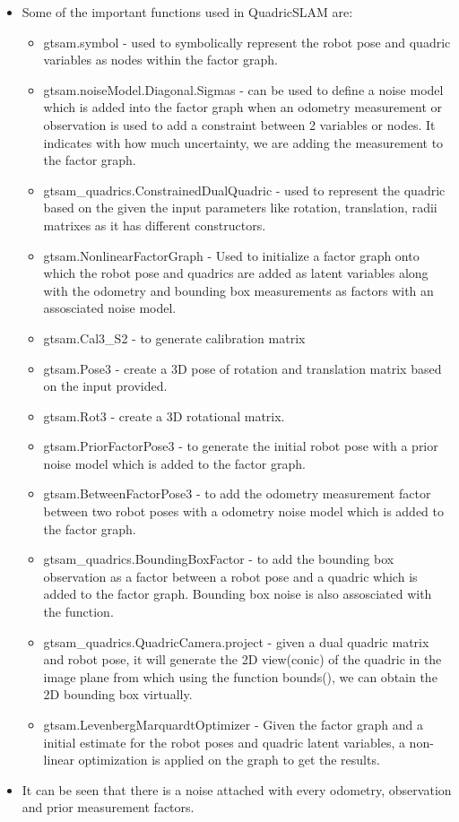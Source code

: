 \documentclass{article}
\begin{document}
\begin{itemize}
\item Some of the important functions used in QuadricSLAM are:
\begin{itemize}
    \item gtsam.symbol - used to symbolically represent the robot pose and quadric variables as nodes within the factor graph.
    \item gtsam.noiseModel.Diagonal.Sigmas - can be used to define a noise model which is added into the factor graph when an odometry measurement or observation is used to add a constraint between 2 variables or nodes. It indicates with how much uncertainty, we are adding the measurement to the factor graph.
    \item gtsam\_quadrics.ConstrainedDualQuadric - used to represent the quadric based on the given the input parameters like rotation, translation, radii matrixes as it has different constructors.
    \item gtsam.NonlinearFactorGraph - Used to initialize a factor graph onto which the robot pose and quadrics are added as latent variables along with the odometry and bounding box measurements as factors with an assosciated noise model.
    \item gtsam.Cal3\_S2 - to generate calibration matrix
    \item gtsam.Pose3 - create a 3D pose of rotation and translation matrix based on the input provided.
    \item gtsam.Rot3 - create a 3D rotational matrix.
    \item gtsam.PriorFactorPose3 - to generate the initial robot pose with a prior noise model which is added to the factor graph.
    \item gtsam.BetweenFactorPose3 - to add the odometry measurement factor between two robot poses with a odometry noise model which is added to the factor graph.
    \item gtsam\_quadrics.BoundingBoxFactor - to add the bounding box observation as a factor between a robot pose and a quadric which is added to the factor graph. Bounding box noise is also assosciated with the function.
    \item gtsam\_quadrics.QuadricCamera.project - given a dual quadric matrix and robot pose, it will generate the 2D view(conic) of the quadric in the image plane from which using the function bounds(), we can obtain the 2D bounding box virtually.
    \item gtsam.LevenbergMarquardtOptimizer - Given the factor graph and a initial estimate for the robot poses and quadric latent variables, a non-linear optimization is applied on the graph to get the results.


    
\end{itemize}

\item It can be seen that there is a noise attached with every odometry, observation and prior measurement factors.
\end{itemize}
\end{document}
